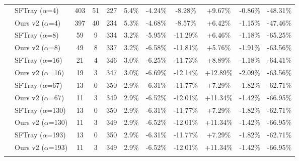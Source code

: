 \begin{table}[t]
{\begin{tabular}{ll|cccc|ccc|cc}
\addlinespace[0.3em]

 & SFTray ($\alpha$=4) & 403 & 51 & 227 & 5.4\% & -4.24\% & -8.28\% & +9.67\% & -0.86\% & -48.31\% \\

 & Ours v2 ($\alpha$=4) & 397 & 40 & 234 & 5.3\% & -4.68\% & -8.57\% & +6.42\% & -1.15\% & -47.46\% \\

\addlinespace[0.3em]

 & SFTray ($\alpha$=8) & 59 & 9 & 334 & 3.2\% & -5.95\% & -11.29\% & +6.46\% & -1.18\% & -65.25\% \\

 & Ours v2 ($\alpha$=8) & 49 & 8 & 337 & 3.2\% & -6.58\% & -11.81\% & +5.76\% & -1.91\% & -63.56\% \\

\addlinespace[0.3em]

 & SFTray ($\alpha$=16) & 21 & 4 & 346 & 3.0\% & -6.25\% & -11.73\% & +8.89\% & -1.18\% & -64.41\% \\

 & Ours v2 ($\alpha$=16) & 19 & 3 & 347 & 3.0\% & -6.69\% & -12.14\% & +12.89\% & -2.09\% & -63.56\% \\

\addlinespace[0.3em]

 & SFTray ($\alpha$=67) & 13 & 0 & 350 & 2.9\% & -6.31\% & -11.77\% & +7.29\% & -1.82\% & -62.71\% \\

 & Ours v2 ($\alpha$=67) & 11 & 3 & 349 & 2.9\% & -6.52\% & -12.01\% & +11.34\% & -1.42\% & -66.95\% \\

\addlinespace[0.3em]

 & SFTray ($\alpha$=130) & 13 & 0 & 350 & 2.9\% & -6.31\% & -11.77\% & +7.29\% & -1.82\% & -62.71\% \\

 & Ours v2 ($\alpha$=130) & 11 & 3 & 349 & 2.9\% & -6.52\% & -12.01\% & +11.34\% & -1.42\% & -66.95\% \\

\addlinespace[0.3em]

 & SFTray ($\alpha$=193) & 13 & 0 & 350 & 2.9\% & -6.31\% & -11.77\% & +7.29\% & -1.82\% & -62.71\% \\

 & Ours v2 ($\alpha$=193) & 11 & 3 & 349 & 2.9\% & -6.52\% & -12.01\% & +11.34\% & -1.42\% & -66.95\% \\

\addlinespace[0.3em]


\end{tabular}}
\end{table}
